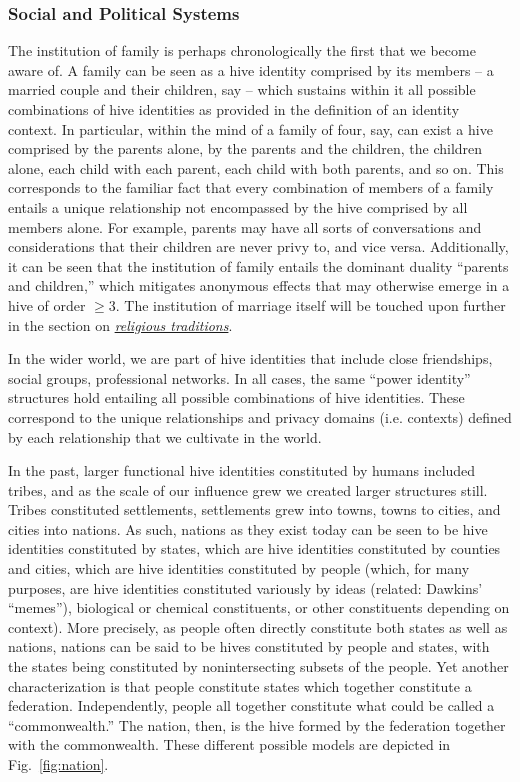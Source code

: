 \documentclass[pra,twocolumn,groupedaddress,10pt]{revtex4}
\theoremstyle{definition}
\begin{document}
\subsubsection{Social and Political Systems}

The institution of family is perhaps chronologically the first that we become aware of. A family can be seen as a hive identity comprised by its members -- a married couple and their children, say -- which sustains within it all possible combinations of hive identities as provided in the definition of an identity context. In particular, within the mind of a family of four, say, can exist a hive comprised by the parents alone, by the parents and the children, the children alone, each child with each parent, each child with both parents, and so on. This corresponds to the familiar fact that every combination of members of a family entails a unique relationship not encompassed by the hive comprised by all members alone. For example, parents may have all sorts of conversations and considerations that their children are never privy to, and vice versa. Additionally, it can be seen that the institution of family entails the dominant duality ``parents and children,'' which mitigates anonymous effects that may otherwise emerge in a hive of order $\geq 3$. The institution of marriage itself will be touched upon further in the section on \hyperref[sec:phirelhistra]{\textit{religious traditions}}.

In the wider world, we are part of hive identities that include close friendships, social groups, professional networks. In all cases, the same ``power identity'' structures hold entailing all possible combinations of hive identities. These correspond to the unique relationships and privacy domains (i.e. contexts) defined by each relationship that we cultivate in the world.

In the past, larger functional hive identities constituted by humans included tribes, and as the scale of our influence grew we created larger structures still. Tribes constituted settlements, settlements grew into towns, towns to cities, and cities into nations. As such, nations as they exist today can be seen to be hive identities constituted by states, which are hive identities constituted by counties and cities, which are hive identities constituted by people (which, for many purposes, are hive identities constituted variously by ideas (related: Dawkins' ``memes''\cite{dawkins}), biological or chemical constituents, or other constituents depending on context). More precisely, as people often directly constitute both states as well as nations, nations can be said to be hives constituted by people and states, with the states being constituted by nonintersecting subsets of the people. Yet another characterization is that people constitute states which together constitute a federation. Independently, people all together constitute what could be called a ``commonwealth.'' The nation, then, is the hive formed by the federation together with the commonwealth. These different possible models are depicted in Fig.~\ref{fig:nation}.
\end{document}
